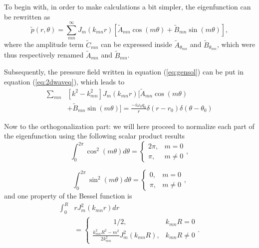 \documentclass[%
 reprint,
 amsmath,amssymb,
 aps,
]{revtex4-2}
\begin{document}
To begin with, in order to make calculations a bit simpler, the eigenfunction can be rewritten as
\begin{equation}
        \tilde{p}(r, \theta) = \sum_{mn}^{\infty} J_m(k_{mn}r) \left[ \tilde{A}_{mn} \cos(m \theta) + \tilde{B}_{mn} \sin(m \theta) \right], \label{eq:gensol}
\end{equation}
where the amplitude term $\tilde{C}_{mn}$ can be expressed inside $\tilde{A}_{\theta_{mn}}$ and $\tilde{B}_{\theta_{mn}}$, which were thus respectively renamed $\tilde{A}_{mn}$ and $\tilde{B}_{mn}$.

Subsequently, the pressure field written in equation (\ref{eq:gensol}) can be put in equation (\ref{eq:2dwaveq}), which leads to
\begin{equation}
    \begin{split}
        \sum_{mn} &\left[ k^2 - k_{mn}^2 \right] J_m(k_{mn}r) \Big[ \tilde{A}_{mn} \cos(m\theta) \\&+ \tilde{B}_{mn} \sin(m\theta) \Big]= \frac{- i \omega_0 q_0 }{r} \delta(r - r_0) \delta(\theta - \theta_0)
    \end{split} \label{eq:rawsol}
\end{equation}

Now to the orthogonalization part: we will here proceed to normalize each part of the eigenfunction using the following scalar product results 
\begin{equation}
   \int_0^{2 \pi} \cos^2\left( m \theta \right) d\theta = 
    \begin{cases}    
        2 \pi, & m = 0\\
        \pi, & m \ne 0
    \end{cases}, \label{eq:dp_2}
\end{equation}

\begin{equation}
    \int_0^{2 \pi} \sin^2\left( m \theta \right) d\theta = 
    \begin{cases}    
        0, & m = 0\\
        \pi, & m \ne 0
    \end{cases}, \label{eq:dp_3}
\end{equation}
and one property of the Bessel function is\cite{abramsteg}
\begin{equation}
    \begin{split}
        \int_0^{R} &r J^2_m (k_{mn} r)dr \\ &=
    \begin{cases}    
        \quad  \quad \quad 1/2, & k_{mn}R = 0\\
        \frac{k^2_{mn} R^2 - m^2}{2 k^2_{mn}} J^2_m (k_{mn} R), & k_{mn}R \ne 0
    \end{cases}.
    \end{split} \label{eq:dp_4}
\end{equation}
\end{document}
